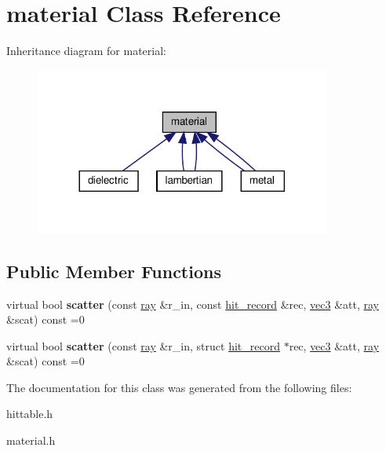 \hypertarget{classmaterial}{}\section{material Class Reference}
\label{classmaterial}


Inheritance diagram for material\+:
\nopagebreak
\begin{figure}[H]
\begin{center}
\leavevmode
\includegraphics[width=276pt]{classmaterial__inherit__graph}
\end{center}
\end{figure}
\subsection*{Public Member Functions}
\begin{DoxyCompactItemize}
\item 
\mbox{\label{classmaterial_a6ffef7f6d9b22511129af150c4142852}} 
virtual bool {\bfseries scatter} (const \hyperlink{classray}{ray} \&r\+\_\+in, const \hyperlink{structhit__record}{hit\+\_\+record} \&rec, \hyperlink{classvec3}{vec3} \&att, \hyperlink{classray}{ray} \&scat) const =0
\item 
\mbox{\label{classmaterial_a78cfbe3c64a6adf08dc016ecdb1789a6}} 
virtual bool {\bfseries scatter} (const \hyperlink{classray}{ray} \&r\+\_\+in, struct \hyperlink{structhit__record}{hit\+\_\+record} $\ast$rec, \hyperlink{classvec3}{vec3} \&att, \hyperlink{classray}{ray} \&scat) const =0
\end{DoxyCompactItemize}


The documentation for this class was generated from the following files\+:\begin{DoxyCompactItemize}
\item 
hittable.\+h\item 
material.\+h\end{DoxyCompactItemize}
